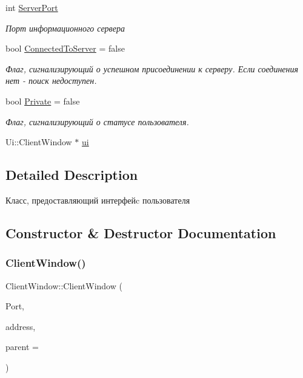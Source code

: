 \begin{DoxyCompactItemize}
int \hyperlink{class_client_window_a3f0c47409cc45b690b52ecf177a86adb}{Server\+Port}
\begin{DoxyCompactList}\small\item\em Порт информационного сервера \end{DoxyCompactList}\item 
bool \hyperlink{class_client_window_a060cbd4e58c77c64edb9b5dd69c8da7d}{Connected\+To\+Server} = false
\begin{DoxyCompactList}\small\item\em Флаг, сигнализирующий о успешном присоединении к серверу. Если соединения нет -\/ поиск недоступен. \end{DoxyCompactList}\item 
bool \hyperlink{class_client_window_a0112c19a3296b1908e823d9baaa2246b}{Private} = false
\begin{DoxyCompactList}\small\item\em Флаг, сигнализирующий о статусе пользователя. \end{DoxyCompactList}\item 
Ui\+::\+Client\+Window $\ast$ \hyperlink{class_client_window_a1fbbfac70cc4e23f0d44ac209804bfc9}{ui}
\end{DoxyCompactItemize}


\subsection{Detailed Description}
Класс, предоставляющий интерфейc пользователя 

\subsection{Constructor \& Destructor Documentation}
\mbox{\label{class_client_window_a23d2aaa14ef2a3587252a32bca6ce9c4}} 
\subsubsection{\texorpdfstring{Client\+Window()}{ClientWindow()}}
{\footnotesize\ttfamily Client\+Window\+::\+Client\+Window (\begin{DoxyParamCaption}\item[{int}]{Port,  }\item[{Q\+String}]{address,  }\item[{Q\+Widget $\ast$}]{parent = {} }\end{DoxyParamCaption})}



